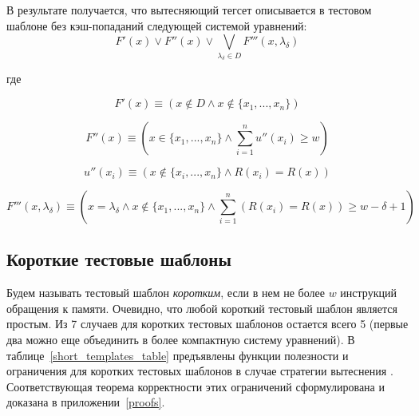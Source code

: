 В результате получается, что вытесняющий тегсет описывается в
тестовом шаблоне без кэш-попаданий следующей системой уравнений:
$$
F'(x) \vee F''(x) \vee \bigvee_{\lambda_\delta \in D} F'''(x, \lambda_\delta)
$$

где

$$F'(x) \equiv (x \notin D \wedge x \notin \{x_1, ..., x_n\})$$

$$F''(x) \equiv (x \in \{x_1, ..., x_n\} \wedge \sum_{i=1}^n u''(x_i) \geqslant w)$$

$$u''(x_i) \equiv (x\notin \{x_i, ..., x_n\} \wedge R(x_i) = R(x))$$

$$F'''(x, \lambda_\delta) \equiv (x = \lambda_\delta \wedge x \notin
\{x_1, ..., x_n\} \wedge \sum_{i=1}^n (R(x_i) = R(x)) \geqslant w -
\delta + 1)$$

\subsection{Короткие тестовые шаблоны}

Будем называть тестовый шаблон \emph{коротким}, если в нем не более
$w$ инструкций обращения к памяти. Очевидно, что любой короткий
тестовый шаблон является простым. Из 7 случаев для коротких тестовых
шаблонов остается всего 5 (первые два можно еще объединить в более
компактную систему уравнений). В таблице~\ref{short_templates_table}
предъявлены функции полезности и ограничения для коротких тестовых
шаблонов в случае стратегии вытеснения \LRU. Соответствующая теорема
корректности этих ограничений сформулирована и доказана в приложении~\ref{proofs}.


